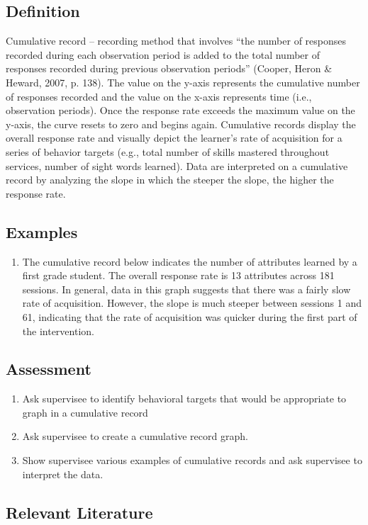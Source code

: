 \subsection{Definition}
Cumulative record – recording method that involves ``the number of responses recorded during each observation period is added to the total number of responses recorded during previous observation periods'' (Cooper, Heron \& Heward, 2007, p. 138). The value on the y-axis represents the cumulative number of responses recorded and the value on the x-axis represents time (i.e., observation periods).  Once the response rate exceeds the maximum value on the y-axis, the curve resets to zero and begins again.  Cumulative records display the overall response rate and visually depict the learner's rate of acquisition for a series of behavior targets (e.g., total number of skills mastered throughout services, number of sight words learned).  Data are interpreted on a cumulative record by analyzing the slope in which the steeper the slope, the higher the response rate.
%
\subsection{Examples}
\begin{enumerate}
\item The cumulative record below indicates the number of attributes learned by a first grade student.  The overall response rate is 13 attributes across 181 sessions.  In general, data in this graph suggests that there was a fairly slow rate of acquisition. However, the slope is much steeper between sessions 1 and 61, indicating that the rate of acquisition was quicker during the first part of the intervention. 
\end{enumerate}
%
\subsection{Assessment}
\begin{enumerate}
\item Ask supervisee to identify behavioral targets that would be appropriate to graph in a cumulative record
\item Ask supervisee to create a cumulative record graph.
\item Show supervisee various examples of cumulative records and ask supervisee to interpret the data.
\end{enumerate}
%
\subsection{Relevant Literature}
\begin{refsection}
\nocite{cooper2007applied,ferster1957schedules}
\printbibliography[heading=none]
\end{refsection}
% 
